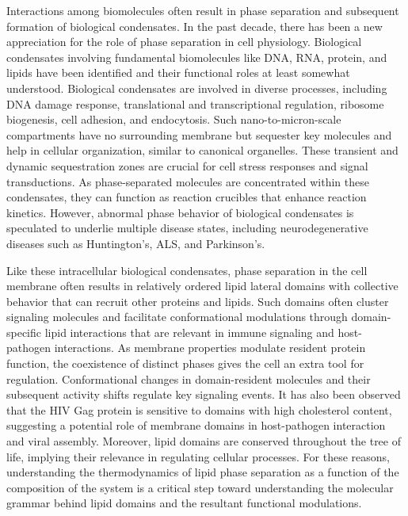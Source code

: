\documentclass{biophys-new}
\begin{document}
Interactions among biomolecules often result in phase separation and subsequent formation of biological condensates\cite{Banani2016}.
In the past decade, there has been a new appreciation for the role of phase separation in cell physiology\cite{Banani2017}. Biological condensates involving fundamental biomolecules like DNA\cite{Larson2017}, RNA\cite{Langdon2018}, protein\cite{Li2012}, and lipids\cite{Sezgin2017} have been identified and their functional roles at least somewhat understood.
Biological condensates are involved in diverse processes, including DNA damage response\cite{Altmeyer2015}, translational\cite{Decker2012} and transcriptional\cite{Lallemand-Breitenbach2010} regulation, ribosome biogenesis\cite{Feric2016}, cell adhesion\cite{Case2015}, and endocytosis\cite{Degreif2019}.
Such nano-to-micron-scale compartments have no surrounding membrane but sequester key molecules and help in cellular organization, similar to canonical organelles\cite{Mao2011,Boisvert2007}.
These transient and dynamic sequestration zones are crucial for cell stress responses\cite{Boisvert2007} and signal transductions\cite{Janosi2012}.
As phase-separated molecules are concentrated within these condensates, they can function as reaction crucibles that enhance reaction kinetics\cite{Strulson2012}.
However, abnormal phase behavior of biological condensates is speculated to underlie multiple disease states, including neurodegenerative diseases such as Huntington's\cite{Li2016}, ALS\cite{Jain2017}, and Parkinson's\cite{Ray2020}.


Like these intracellular biological condensates, phase separation in the cell membrane often results in relatively ordered lipid lateral domains with collective behavior that can recruit other proteins and lipids\cite{Sezgin2017, Case2019}.
Such domains often cluster signaling molecules\cite{Tian2007} and facilitate conformational modulations through domain-specific lipid interactions\cite{Laganowsky2014,Lingwood2011} that are relevant in immune signaling\cite{Beck-garcia2015,Wisser2017} and host-pathogen interactions\cite{Dick2012}.
As membrane properties modulate resident protein function, the coexistence of distinct phases gives the cell an extra tool for regulation.
Conformational changes in domain-resident molecules and their subsequent activity shifts regulate key signaling events\cite{Laganowsky2014,Lingwood2011}.
It has also been observed that the HIV Gag protein is sensitive to domains with high cholesterol content, suggesting a potential role of membrane domains in host-pathogen interaction and viral assembly\cite{Dick2012}.
Moreover, lipid domains are conserved throughout the tree of life, implying their relevance in regulating cellular processes\cite{Sezgin2017}. 
For these reasons, understanding the thermodynamics of lipid phase separation as a function of the composition of the system is a critical step toward understanding the molecular grammar behind lipid domains and the resultant functional modulations. 
\end{document}
